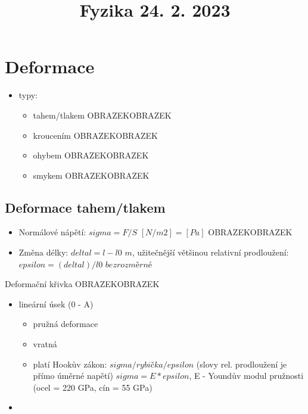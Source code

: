 \documentclass{article}
\title{\vspace{-2cm}Fyzika 24. 2. 2023\vspace{-1.7cm}}
\date{}
\author{}
\begin{document}
\maketitle

\section{Deformace}
\begin{itemize}
  \item typy:
  \begin{itemize}
    \item tahem/tlakem OBRAZEKOBRAZEK
    \item kroucením OBRAZEKOBRAZEK
    \item ohybem OBRAZEKOBRAZEK
    \item smykem OBRAZEKOBRAZEK
  \end{itemize}
\end{itemize}

\subsection{Deformace tahem/tlakem}
\begin{itemize}
\item Normálové nápětí: $sigma=F/S$ $[N/m2] = [Pa]$ OBRAZEKOBRAZEK
\item Změna délky: $delta l = l - l0$ $m$, užitečnější většinou relativní prodloužení: $epsilon = (delta l)/l0$ $bezrozměrné$
\end{itemize}
Deformační křivka
OBRAZEKOBRAZEK
\begin{itemize}
  \item lineární úsek (0 - A)
  \begin{itemize}
    \item pružná deformace
    \item vratná
    \item platí Hookův zákon: $sigma /rybička/ epsilon$ (slovy rel. prodloužení je přímo úměrné napětí) $sigma = E*epsilon$, E - Youndův modul pružnosti (ocel = 220 GPa, cín = 55 GPa)
  \end{itemize}
  \item 
\end{itemize}
\end{document}
